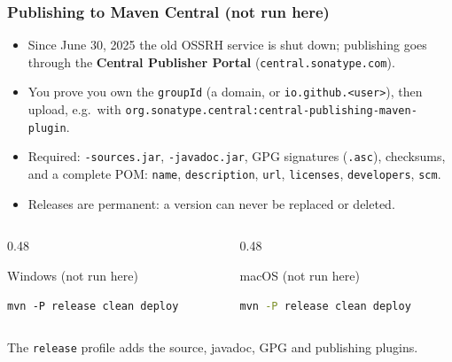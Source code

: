\documentclass[aspectratio=169,10pt,compress]{beamer}
\begin{document}
\begin{frame}[t,fragile] \frametitle{Publishing to Maven Central (not run here)}
  \begin{itemize}\small
    \item Since June 30, 2025 the old OSSRH service is shut down; publishing goes through the \textbf{Central Publisher Portal} (\texttt{central.sonatype.com}).
    \item You prove you own the \texttt{groupId} (a domain, or \texttt{io.github.<user>}), then upload, e.g.\ with \texttt{org.sonatype.central:central-publishing-maven-plugin}.
    \item Required: \texttt{-sources.jar}, \texttt{-javadoc.jar}, GPG signatures (\texttt{.asc}), checksums, and a complete POM: \texttt{name}, \texttt{description}, \texttt{url}, \texttt{licenses}, \texttt{developers}, \texttt{scm}.
    \item Releases are permanent: a version can never be replaced or deleted.
  \end{itemize}
  \begin{columns}[T]
    \begin{column}{0.48\textwidth}
      \begin{block}{Windows (not run here)}


\begin{lstlisting}[style=codesnippet, language={}, basicstyle=\ttfamily\scriptsize]
mvn -P release clean deploy
\end{lstlisting}


      \end{block}
    \end{column}
    \begin{column}{0.48\textwidth}
      \begin{block}{macOS (not run here)}


\begin{lstlisting}[style=codesnippet, language=bash, basicstyle=\ttfamily\scriptsize]
mvn -P release clean deploy
\end{lstlisting}


      \end{block}
    \end{column}
  \end{columns}

  \small The \texttt{release} profile adds the source, javadoc, GPG and publishing plugins.
\end{frame}
\end{document}
